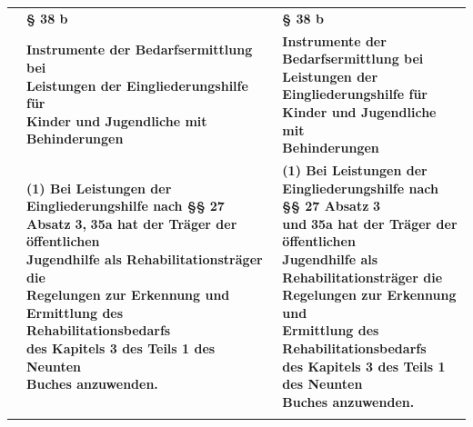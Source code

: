 \documentclass[10pt,a4paper,landscape]{article}
\begin{document}
\begin{longtable}{|L{8.2cm}|L{8.2cm}|L{8.2cm}|}
\hhline{|---|}
 & \textbf{\S{} 38 b } & \textbf{\S{} 38 b } \\
\hhline{|---|}
 & \textbf{Instrumente der Bedarfsermittlung bei  \newline Leistungen der Eingliederungshilfe für  \newline Kinder und Jugendliche mit  \newline Behinderungen } & \textbf{Instrumente der Bedarfsermittlung bei  \newline Leistungen der Eingliederungshilfe für  \newline Kinder und Jugendliche mit  \newline Behinderungen } \\
\hhline{|---|}
 & \textbf{(1) Bei Leistungen der  \newline Eingliederungshilfe nach \S{}\S{} 27 Absatz} \newline \textbf{\textcolor{diffred}{3,}}\textbf{ 35a hat der Träger der öffentlichen  \newline Jugendhilfe als Rehabilitationsträger die  \newline Regelungen zur Erkennung und  \newline Ermittlung des Rehabilitationsbedarfs  \newline des Kapitels 3 des Teils 1 des Neunten  \newline Buches anzuwenden. } & \textbf{(1) Bei Leistungen der  \newline Eingliederungshilfe nach \S{}\S{} 27 Absatz }\textbf{\textcolor{diffgreen}{3  \newline und}}\textbf{ 35a hat der Träger der öffentlichen  \newline Jugendhilfe als Rehabilitationsträger die  \newline Regelungen zur Erkennung und  \newline Ermittlung des Rehabilitationsbedarfs  \newline des Kapitels 3 des Teils 1 des Neunten  \newline Buches anzuwenden. } \\
\hhline{|---|}

\end{longtable}
\end{document}
